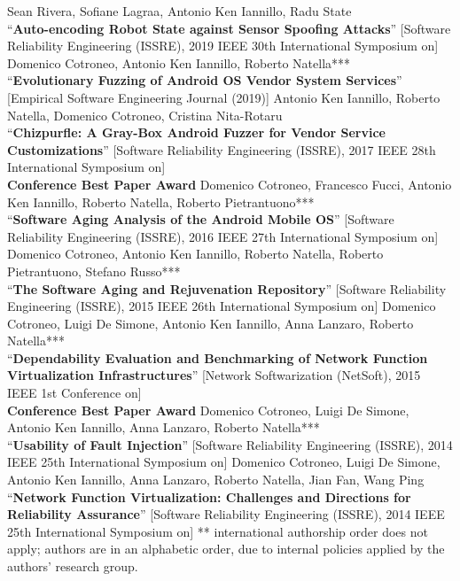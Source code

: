 \documentclass[margin,line]{resume}
\begin{document}
\begin{resume}
\filbreak
Sean Rivera, Sofiane Lagraa, Antonio Ken Iannillo, Radu State\\
``\textbf{Auto-encoding Robot State against Sensor Spoofing Attacks}''
[Software Reliability Engineering (ISSRE), 2019 IEEE 30th International Symposium on]
\filbreak
Domenico Cotroneo, Antonio Ken Iannillo, Roberto Natella***\\
``\textbf{Evolutionary Fuzzing of Android OS Vendor System Services}''
[Empirical Software Engineering Journal (2019)]
\filbreak
Antonio Ken Iannillo, Roberto Natella, Domenico Cotroneo, Cristina Nita-Rotaru\\
``\textbf{Chizpurfle: A Gray-Box Android Fuzzer for Vendor Service Customizations}''
[Software Reliability Engineering (ISSRE), 2017 IEEE 28th International Symposium on]\\\textbf{Conference Best Paper Award}
\filbreak
Domenico Cotroneo, Francesco Fucci, Antonio Ken Iannillo, Roberto Natella, Roberto Pietrantuono***\\
``\textbf{Software Aging Analysis of the Android Mobile OS}''
[Software Reliability Engineering (ISSRE), 2016 IEEE 27th International Symposium on]
\filbreak
Domenico Cotroneo, Antonio Ken Iannillo, Roberto Natella, Roberto Pietrantuono, Stefano Russo***\\
``\textbf{The Software Aging and Rejuvenation Repository}''
[Software Reliability Engineering (ISSRE), 2015 IEEE 26th International Symposium on]
\filbreak
Domenico Cotroneo, Luigi De Simone, Antonio Ken Iannillo, Anna Lanzaro, Roberto Natella***\\
``\textbf{Dependability Evaluation and Benchmarking of Network Function Virtualization Infrastructures}''
[Network Softwarization (NetSoft), 2015 IEEE 1st Conference on]\\\textbf{Conference Best Paper Award}
\filbreak
Domenico Cotroneo, Luigi De Simone, Antonio Ken Iannillo, Anna Lanzaro, Roberto Natella***\\
``\textbf{Usability of Fault Injection}''
[Software Reliability Engineering (ISSRE), 2014 IEEE 25th International Symposium on]
\filbreak
Domenico Cotroneo, Luigi De Simone, Antonio Ken Iannillo, Anna Lanzaro, Roberto Natella, Jian Fan, Wang Ping\\
``\textbf{Network Function Virtualization: Challenges and Directions for Reliability Assurance}''
[Software Reliability Engineering (ISSRE), 2014 IEEE 25th International Symposium on]
\filbreak
{\footnotesize*** international authorship order does not apply; authors are in an alphabetic order, due to internal policies applied by the authors' research group.}







\end{resume}
\end{document}
